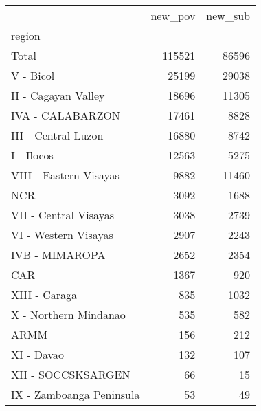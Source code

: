 \begin{tabular}{lrr}
\toprule
{} &  new\_pov &  new\_sub \\
region                   &          &          \\
\midrule
Total                    &   115521 &    86596 \\
V - Bicol                &    25199 &    29038 \\
II - Cagayan Valley      &    18696 &    11305 \\
IVA - CALABARZON         &    17461 &     8828 \\
III - Central Luzon      &    16880 &     8742 \\
I - Ilocos               &    12563 &     5275 \\
VIII - Eastern Visayas   &     9882 &    11460 \\
NCR                      &     3092 &     1688 \\
VII - Central Visayas    &     3038 &     2739 \\
VI - Western Visayas     &     2907 &     2243 \\
IVB - MIMAROPA           &     2652 &     2354 \\
CAR                      &     1367 &      920 \\
XIII - Caraga            &      835 &     1032 \\
X - Northern Mindanao    &      535 &      582 \\
ARMM                     &      156 &      212 \\
XI - Davao               &      132 &      107 \\
XII - SOCCSKSARGEN       &       66 &       15 \\
IX - Zamboanga Peninsula &       53 &       49 \\
\bottomrule
\end{tabular}
